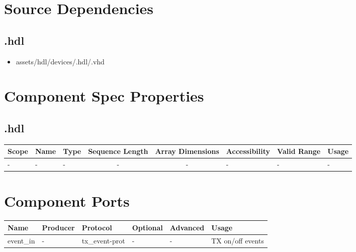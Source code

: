 \section*{Source Dependencies}
\subsection*{\comp.hdl}
\begin{itemize}
  \item assets/hdl/devices/\comp{}.hdl/\comp{}.vhd
\end{itemize}
\begin{landscape}

  \section*{Component Spec Properties}
  \begin{scriptsize}
  \subsection*{\comp.hdl}
      \begin{tabular}{|p{2cm}|p{2cm}|p{1cm}|c|c|p{1.75cm}|p{1.5cm}|p{7cm}|}
      \hline
      \rowcolor{blue}
      Scope    & Name  				& Type  & Sequence Length 	& Array Dimensions 	& Accessibility & Valid Range 	& Usage \\
      \hline
      - & - & - & - & - & - & - & - \\
      \hline
  \end{tabular}
  \end{scriptsize}

  \section*{Component Ports}
  \begin{scriptsize}
    \begin{tabular}{|p{2cm}|p{1.5cm}|p{4cm}|p{1.5cm}|p{1.5cm}|p{10cm}|}
      \hline
      \rowcolor{blue}
      Name 		& Producer & Protocol           & Optional & Advanced & Usage      		\\
      \hline
      event\_in & -        & tx\_event-prot     & -        & -        & TX on/off events\\
      \hline
    \end{tabular}
  \end{scriptsize}


\end{landscape}
